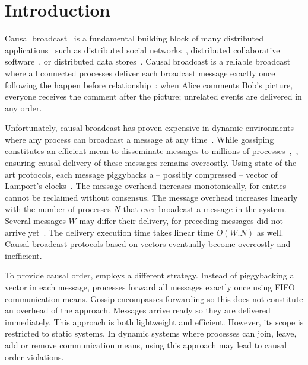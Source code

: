 
\section{Introduction}

Causal broadcast~\cite{hadzilacos1994modular} is a fundamental building block of
many distributed applications~\cite{nakamoto2009bitcoin} such as distributed
social networks~\cite{borthakur2013petabyte}, distributed collaborative
software~\cite{nedelec2016crate,heinrich2012exploiting}, or distributed data
stores~\cite{demers1987epidemic,shapiro2011comprehensive,bailis2013bolton,lloyd2011cops,bravo2017saturn}.
Causal broadcast is a reliable broadcast where all connected processes
deliver each broadcast message exactly once following the happen
before relationship~\cite{lamport1978time,schwarz1994detecting}: when
Alice comments Bob's picture, everyone receives the comment after the
picture; unrelated events are delivered in any order.

Unfortunately, causal broadcast has proven expensive in dynamic environments
where any process can broadcast a message at any
time~\cite{charronbost1991concerning}. While gossiping constitutes an efficient
mean to disseminate messages to millions of
processes~\cite{demers1987epidemic},~\cite{birman1999bimodal}, ensuring causal
delivery of these messages remains overcostly.  Using state-of-the-art
protocols, each message piggybacks a -- possibly compressed -- vector of
Lamport's
clocks~\cite{almeida2008interval,fidge1988timestamps,mattern1989virtual,singhal1992efficient}.
The message overhead increases monotonically, for entries cannot be reclaimed
without consensus. The message overhead increases linearly with the number of
processes $N$ that ever broadcast a message in the system. Several messages $W$
may differ their delivery, for preceding messages did not arrive
yet~\cite{mehdi2017slowdown}.  The delivery execution time takes linear time
$O(W.N)$ as well.  Causal broadcast protocols based on vectors eventually become
overcostly and inefficient.


To provide causal order, \cite{friedman2004causal} employs a different
strategy. Instead of piggybacking a vector in each message, processes forward
all messages exactly once using FIFO communication means. Gossip encompasses
forwarding so this does not constitute an overhead of the approach.  Messages
arrive ready so they are delivered immediately. This approach is both
lightweight and efficient. However, its scope is restricted to static systems.
In dynamic systems where processes can join, leave, add or remove communication
means, using this approach may lead to causal order violations.



